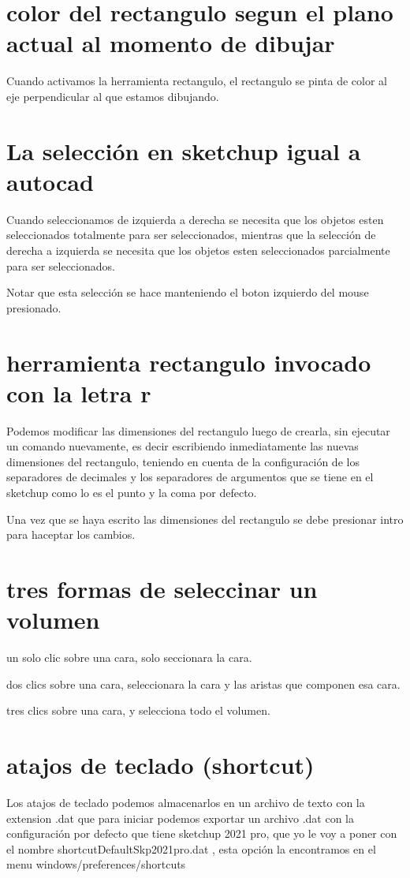 \section{color del rectangulo segun el plano actual al momento de dibujar}

Cuando activamos la herramienta rectangulo, el rectangulo se pinta de color
al eje perpendicular al que estamos dibujando.

\section{La selección en sketchup igual a autocad}

Cuando seleccionamos de izquierda a derecha se necesita que los objetos
esten seleccionados totalmente para ser seleccionados, mientras que la
selección de derecha a izquierda se necesita que los objetos esten
seleccionados parcialmente para ser seleccionados.

Notar que esta selección se hace manteniendo el boton izquierdo del mouse
presionado.

\section{herramienta rectangulo invocado con la letra r}

Podemos modificar las dimensiones del rectangulo luego de crearla, sin
ejecutar un comando nuevamente, es decir escribiendo inmediatamente las
nuevas dimensiones del rectangulo, teniendo en cuenta de la configuración
de los separadores de decimales y los separadores de argumentos que se tiene
en el sketchup como lo es el punto y la coma por defecto.

Una vez que se haya escrito las dimensiones del rectangulo se debe presionar
intro para haceptar los cambios.

\section{tres formas de seleccinar un volumen}

un solo clic sobre una cara, solo seccionara la cara.

dos clics sobre una cara, seleccionara la cara y las aristas que componen esa
cara.

tres clics sobre una cara, y selecciona todo el volumen.

\section{atajos de teclado (shortcut)}

Los atajos de teclado podemos almacenarlos en un archivo de texto con la
extension .dat que para iniciar podemos exportar un archivo .dat con la
configuración por defecto que tiene sketchup 2021 pro, que yo le voy a poner
con el nombre shortcutDefaultSkp2021pro.dat , esta opción la encontramos en
el menu windows/preferences/shortcuts
